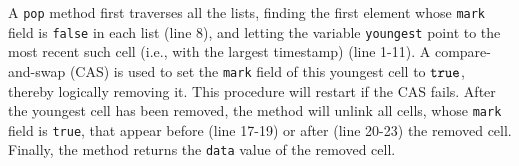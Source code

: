 A {\tt pop} method first traverses all the lists, finding
the first element whose {\tt mark} field is {\tt false} in each list (line 8), and letting the variable {\tt youngest} point to the most recent such cell
(i.e., with the largest timestamp) (line 1-11).
A compare-and-swap (CAS) is used
to set the {\tt mark} field of this youngest cell to ${\tt true}$,
thereby logically removing it.
This procedure will restart if the CAS fails. After the youngest cell has been removed, the method will unlink all cells, whose {\tt mark} field is {\tt true},
that appear before (line 17-19) or after (line 20-23) the removed cell.
Finally, the method returns the {\tt data} value of the removed cell.


